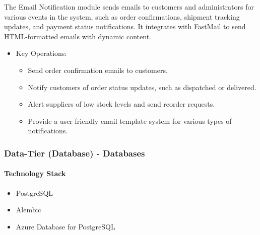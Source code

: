\documentclass{llncs}
\begin{document}
The Email Notification module sends emails to customers and administrators for various events in the system, such as order confirmations, shipment tracking updates, and payment status notifications. It integrates with FastMail to send HTML-formatted emails with dynamic content.
\begin{itemize}
    \item Key Operations:
          \begin{itemize}
              \item Send order confirmation emails to customers.
              \item Notify customers of order status updates, such as dispatched or delivered.
              \item Alert suppliers of low stock levels and send reorder requests.
              \item Provide a user-friendly email template system for various types of notifications.
          \end{itemize}
\end{itemize}

\subsubsection{Data-Tier (Database) - Databases}
\paragraph{Technology Stack}
\begin{itemize}
    \item PostgreSQL
    \item Alembic
    \item Azure Database for PostgreSQL
\end{itemize}
\end{document}
